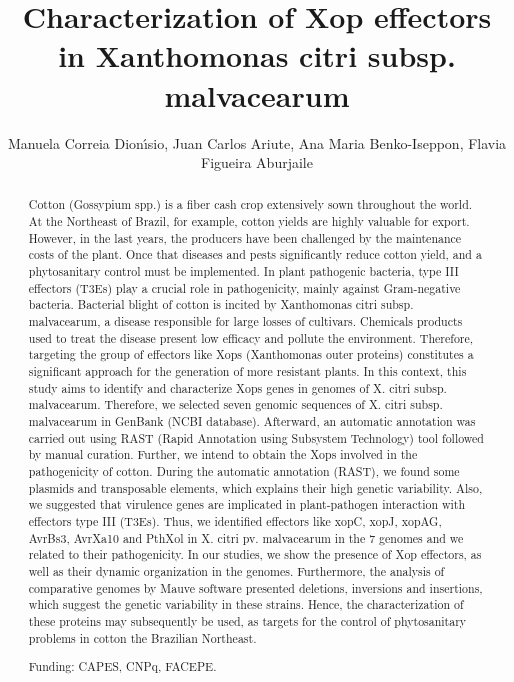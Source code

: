 \documentclass[twoside]{article}
\title{\vspace{-15mm}\fontsize{24pt}{10pt}\selectfont\textbf{ Characterization of Xop effectors in Xanthomonas citri subsp. malvacearum }} %
\author{ Manuela Correia Dion\'{\i}sio, Juan Carlos Ariute, Ana Maria Benko-Iseppon, Flavia Figueira Aburjaile }
\affil{ UFPE }
\date{}
\begin{document}
  
  
  \maketitle %
  
  
  \thispagestyle{fancy} %
  
  
  \begin{abstract}
  Cotton (Gossypium spp.) is a fiber cash crop extensively sown throughout the world. At the Northeast of Brazil,  for example,  cotton yields are highly valuable for export. However,  in the last years,  the producers have been challenged by the maintenance costs of the plant. Once that diseases and pests significantly reduce cotton yield,  and a phytosanitary control must be implemented. In plant pathogenic bacteria,  type III effectors (T3Es) play a crucial role in pathogenicity,  mainly against Gram-negative bacteria. Bacterial blight of cotton is incited by Xanthomonas citri subsp. malvacearum,  a disease responsible for large losses of cultivars. Chemicals products used to treat the disease present low efficacy and pollute the environment. Therefore,  targeting the group of effectors like Xops (Xanthomonas outer proteins) constitutes a significant approach for the generation of more resistant plants. In this context,  this study aims to identify and characterize Xops genes in genomes of X. citri subsp. malvacearum. Therefore,  we selected seven genomic sequences of X. citri subsp. malvacearum in GenBank (NCBI database). Afterward,  an automatic annotation was carried out using RAST (Rapid Annotation using Subsystem Technology) tool followed by manual curation. Further,  we intend to obtain the Xops involved in the pathogenicity of cotton. During the automatic annotation (RAST),  we found some plasmids and transposable elements,  which explains their high genetic variability. Also,  we suggested that virulence genes are implicated in plant-pathogen interaction with effectors type III (T3Es). Thus,  we identified effectors like xopC,  xopJ,  xopAG,  AvrBs3,  AvrXa10 and PthXol in X. citri pv. malvacearum in the 7 genomes and we related to their pathogenicity. In our studies,  we show the presence of Xop effectors,  as well as their dynamic organization in the genomes. Furthermore,  the analysis of comparative genomes by Mauve software presented deletions,  inversions and insertions,  which suggest the genetic variability in these strains. Hence,  the characterization of these proteins may subsequently be used,  as targets for the control of phytosanitary problems in cotton the Brazilian Northeast.
  
  Funding: CAPES,  CNPq,  FACEPE. \\ 
  \end{abstract}
  
\end{document}
